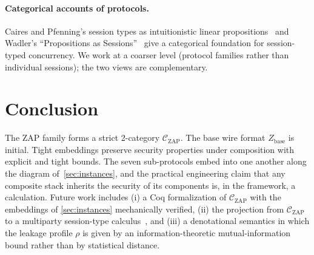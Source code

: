 \documentclass[11pt]{article}
\theoremstyle{definition}
\theoremstyle{remark}
\newcommand{\CZ}{\mathcal{C}_{\mathrm{ZAP}}}
\newcommand{\Zb}{Z_{\mathrm{base}}}
\begin{document}
\paragraph{Categorical accounts of protocols.}
Caires and Pfenning's session types as
intuitionistic linear propositions~\cite{caires2010session} and
Wadler's ``Propositions as Sessions''~\cite{wadler2012propositions}
give a categorical foundation for session-typed concurrency. We work
at a coarser level (protocol families rather than individual
sessions); the two views are complementary.

\section{Conclusion}
\label{sec:conclusion}

The ZAP family forms a strict 2-category $\CZ$. The base wire format
$\Zb$ is initial. Tight embeddings preserve security properties under
composition with explicit and tight bounds. The seven sub-protocols
embed into one another along the diagram of~\cref{sec:instances}, and
the practical engineering claim that any composite stack inherits
the security of its components is, in the framework, a calculation.
Future work includes (i) a Coq formalization of $\CZ$ with the
embeddings of \cref{sec:instances} mechanically verified, (ii) the
projection from $\CZ$ to a multiparty session-type
calculus~\cite{honda2016multiparty}, and (iii) a denotational
semantics in which the leakage profile $\rho$ is given by an
information-theoretic mutual-information bound rather than by
statistical distance.

\printbibliography
\end{document}
